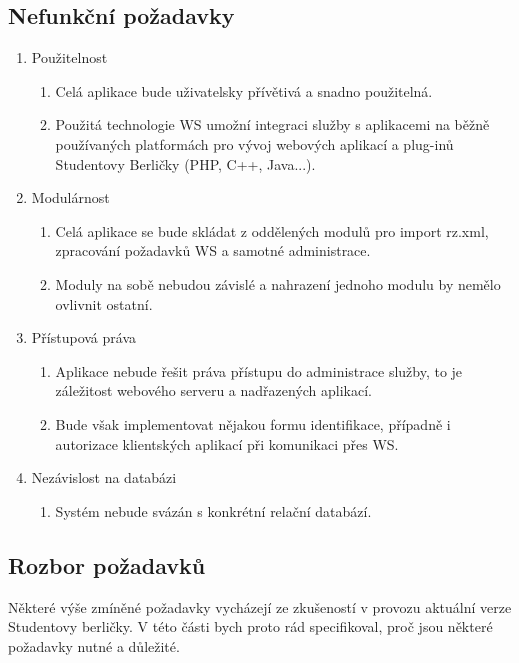 \documentclass[11pt,twoside,a4paper]{book}
\begin{document}
\subsection{Nefunkční požadavky}
\begin{enumerate}
\item Použitelnost
\begin{enumerate}
\item Celá aplikace bude uživatelsky přívětivá a snadno použitelná.
\item Použitá technologie WS umožní integraci služby s aplikacemi na běžně používaných platformách pro vývoj webových aplikací a plug-inů Studentovy Berličky (PHP, C++, Java...).
\end{enumerate}

\item Modulárnost
\begin{enumerate}
\item Celá aplikace se bude skládat z oddělených modulů pro import rz.xml, zpracování požadavků WS a samotné administrace.
\item Moduly na sobě nebudou závislé a nahrazení jednoho modulu by nemělo ovlivnit ostatní.
\end{enumerate}

\item Přístupová práva
\begin{enumerate}
\item Aplikace nebude řešit práva přístupu do administrace služby, to je záležitost webového serveru a nadřazených aplikací.
\item Bude však implementovat nějakou formu identifikace, případně i autorizace klientských aplikací při komunikaci přes WS.
\end{enumerate}

\item Nezávislost na databázi
\begin{enumerate}
\item Systém nebude svázán s konkrétní relační databází.
\end{enumerate}

\end{enumerate}

\subsection{Rozbor požadavků} \label{rozbor}
Některé výše zmíněné požadavky vycházejí ze zkušeností v provozu aktuální verze Studentovy berličky. V této části bych proto rád specifikoval, proč jsou některé požadavky nutné a důležité.
\end{document}
